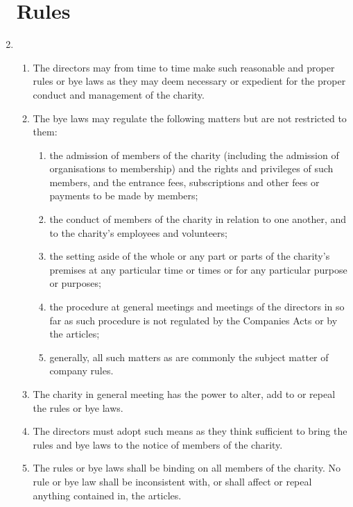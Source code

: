 \documentclass{article}
\begin{document}
\begin{enumerate}[label=\arabic*, start=23]
    \section{Rules}
    \item \begin{enumerate}[label=(\arabic*)]
        \item The directors may from time to time make such reasonable and
        proper rules or bye laws as they may deem necessary
        or expedient for the proper conduct and management of
        the charity.
        \item The bye laws may regulate the following matters but are not
        restricted to them:
        \begin{enumerate}[label=(\alph*)]
            \item the admission of members of the charity (including the
            admission of organisations to membership) and the
            rights and privileges of such members, and the entrance
            fees, subscriptions and other fees or payments to be
            made by members;
            \item the conduct of members of the charity in relation to one
            another, and to the charity’s employees and volunteers;
            \item the setting aside of the whole or any part or parts of the
            charity’s premises at any particular time or times or for
            any particular purpose or purposes;
            \item the procedure at general meetings and meetings of the
            directors in so far as such procedure is not regulated by
            the Companies Acts or by the articles;
            \item generally, all such matters as are commonly the subject
            matter of company rules.
        \end{enumerate}
        \item The charity in general meeting has the power to alter, add to or
        repeal the rules or bye laws.
        \item The directors must adopt such means as they think sufficient
        to bring the rules and bye laws to the notice of members of
        the charity.
        \item The rules or bye laws shall be binding on all members of the
        charity. No rule or bye law shall be inconsistent with, or shall
        affect or repeal anything contained in, the articles.
    \end{enumerate}
    

\end{enumerate}
\end{document}
